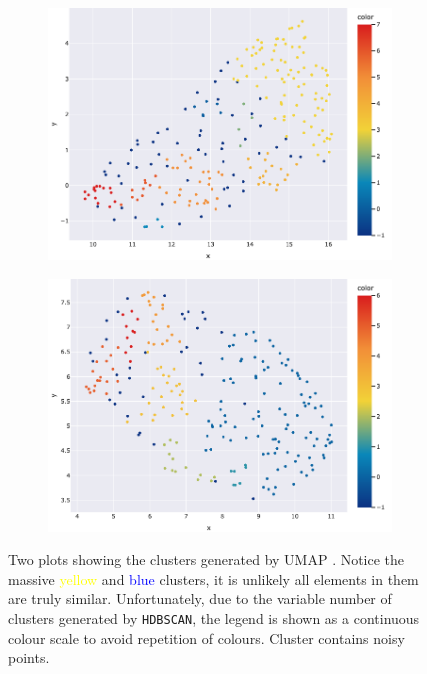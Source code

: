 \begin{figure}[th]
     \centering
     \begin{subfigure}[b]{0.45\textwidth}
         \centering
         \includegraphics[width=\textwidth]{chapters/assets/c3lr_extra/c1.png}
     \end{subfigure}
     \hspace{1cm}
     \begin{subfigure}[b]{0.45\textwidth}
         \centering
         \includegraphics[width=\textwidth]{chapters/assets/c3lr_extra/c2.png}
     \end{subfigure}
     \label{fig:c3lr-hdbscan-results}
     \caption{Two plots showing the clusters generated by UMAP \parencite{mcinnes2018umap}. Notice the massive \textcolor{yellow}{yellow} and \textcolor{blue}{blue} clusters, it is unlikely all elements in them are truly similar. Unfortunately, due to the variable number of clusters generated by \texttt{HDBSCAN}, the legend is shown as a continuous colour scale to avoid repetition of colours. Cluster  contains noisy points.}
\end{figure}


